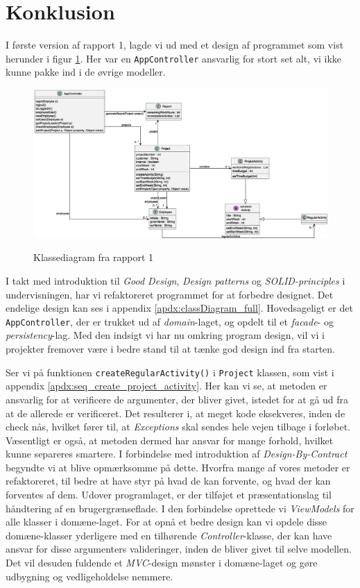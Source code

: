 \section{Konklusion} \label{chap:conclusion}
I første version af rapport 1, lagde vi ud med et design af programmet som vist herunder i figur \ref{fig:class_report1}. Her var en \texttt{AppController} ansvarlig for stort set alt, vi ikke kunne pakke ind i de øvrige modeller.
\begin{figure}[H]
    \centering
    \caption{Klassediagram fra rapport 1}
    \includegraphics[width = 12cm, keepaspectratio]{RequirementsAndDesign/Diagrams/ClassDiagram.eps}
    \label{fig:class_report1}
\end{figure}
I takt med introduktion til \textit{Good Design}, \textit{Design patterns} og \textit{SOLID-principles} i undervisningen, har vi refaktoreret programmet for at forbedre designet. Det endelige design kan ses i appendix \ref{apdx:classDiagram_full}. Hovedsageligt er det \texttt{AppController}, der er trukket ud af \textit{domain}-laget, og opdelt til et \textit{facade}- og \textit{persistency}-lag. Med den indsigt vi har nu omkring program design, vil vi i projekter fremover være i bedre stand til at tænke god design ind fra starten.

Ser vi på funktionen \texttt{createRegularActivity()} i \texttt{Project} klassen, som vist i appendix \ref{apdx:seq_create_project_activity}. Her kan vi se, at metoden er ansvarlig for at verificere de argumenter, der bliver givet, istedet for at gå ud fra at de allerede er verificeret. Det resulterer i, at meget kode eksekveres, inden de check nås, hvilket fører til, at \textit{Exceptions} skal sendes hele vejen tilbage i forløbet. Væsentligt er også, at metoden dermed har ansvar for mange forhold, hvilket kunne separeres smartere. I forbindelse med introduktion af \textit{Design-By-Contract} begyndte vi at blive opmærksomme på dette. Hvorfra mange af vores metoder er refaktoreret, til bedre at have styr på hvad de kan forvente, og hvad der kan forventes af dem. 
Udover programlaget, er der tilføjet et præsentationslag til håndtering af en brugergrænseflade. I den forbindelse oprettede vi \textit{ViewModels} for alle klasser i domæne-laget. For at opnå et bedre design kan vi opdele disse domæne-klasser yderligere med en tilhørende \textit{Controller}-klasse, der kan have ansvar for disse argumenters valideringer, inden de bliver givet til selve modellen. Det vil desuden fuldende et \textit{MVC}-design mønster i domæne-laget og gøre udbygning og vedligeholdelse nemmere.
\newline

